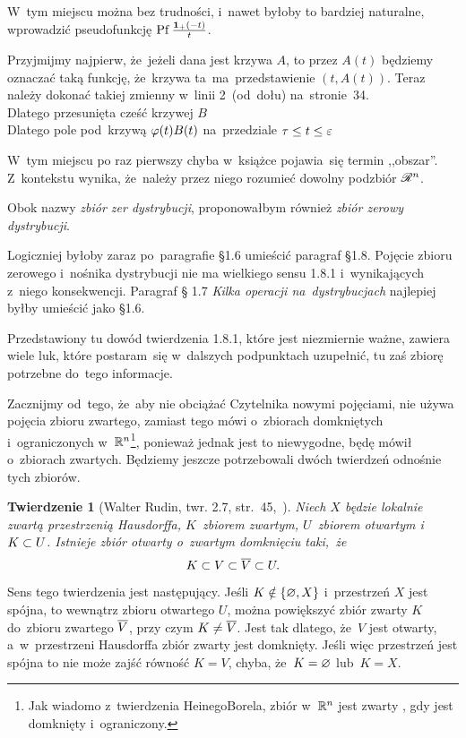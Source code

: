 \documentclass[a4paper,11pt]{article}
\newtheorem{twr}{Twierdzenie} %
\begin{document}
\start {} W~tym miejscu można bez trudności, i~nawet byłoby to
bardziej naturalne, wprowadzić pseudofunkcję
$\mathrm{Pf}\, \frac{ \mathbf{1}_{ + }( -t )}{ t }$.

\start {} Przyjmijmy najpierw, że~jeżeli dana jest krzywa
$A$, to przez $A( t )$ będziemy oznaczać taką funkcję, że~krzywa
ta~ma~przedstawienie $( t, A( t ) )$. Teraz należy dokonać takiej
zmienny w~linii 2~(od~dołu) na~stronie~34. \\
\Jest Dlatego przesunięta cześć krzywej $B$ \\
\Pow Dlatego pole pod~krzywą $\varphi( t ) B( t )$ na~przedziale
$\tau \leq t \leq \varepsilon$

\start {} W~tym miejscu po raz pierwszy chyba w~książce
pojawia~się termin ,,obszar''. Z~kontekstu wynika, że~należy przez
niego rozumieć dowolny podzbiór $\mathcal{R}^{ n }$.

\start {} Obok nazwy \emph{zbiór zer dystrybucji}, proponowałbym
również \emph{zbiór zerowy dystrybucji}.

\start {} Logiczniej byłoby zaraz po~paragrafie \S 1.6 umieścić
paragraf \S 1.8. Pojęcie zbioru zerowego i~nośnika dystrybucji nie ma
wielkiego sensu 1.8.1 i~wynikających z~niego konsekwencji. Paragraf \S
1.7 \emph{Kilka operacji na~dystrybucjach} najlepiej byłby umieścić
jako \S 1.6.

\start {} Przedstawiony tu dowód twierdzenia 1.8.1, które
jest niezmiernie ważne, zawiera wiele luk, które postaram~się
w~dalszych podpunktach uzupełnić, tu zaś zbiorę potrzebne do~tego
informacje.

Zacznijmy od~tego, że~aby nie obciążać Czytelnika nowymi pojęciami,
nie używa pojęcia zbioru zwartego, zamiast tego mówi o~zbiorach
domkniętych i~ograniczonych w~$\mathbb{ R }^{ n }$\footnote{Jak wiadomo z~twierdzenia
  Heinego\dywiz Borela, zbiór w~$\mathbb{ R }^{ n }$ jest zwarty \wtw, gdy jest
  domknięty i~ograniczony.}, ponieważ jednak jest to niewygodne, będę
mówił o~zbiorach zwartych. Będziemy jeszcze potrzebowali dwóch
twierdzeń odnośnie tych zbiorów.

\begin{twr}[Walter Rudin, twr. 2.7, str.~45,~\cite{Rud98}]
  \label{twr:Zem-s01-01}
  Niech $X$ będzie lokalnie zwartą przestrzenią Hausdorffa,
  $K$~zbiorem zwartym, $U$~zbiorem otwartym i~$K \subset U$. Istnieje
  zbiór otwarty o~zwartym domknięciu taki,~że
  \begin{equation}
    \label{eq:Zem-s01-04}
    K \subset V \subset \overline{ V } \subset U.
  \end{equation}
\end{twr}
Sens tego twierdzenia jest następujący. Jeśli $K \notin \{ \varnothing, X \}$
i~przestrzeń $X$ jest spójna, to wewnątrz zbioru otwartego $U$, można
powiększyć zbiór zwarty $K$ do~zbioru zwartego $\overline{ V }$, przy czym
$K \neq \overline{ V }$. Jest tak dlatego, że~$V$ jest otwarty,
a~w~przestrzeni Hausdorffa zbiór zwarty jest domknięty. Jeśli więc
przestrzeń jest spójna to nie może zajść równość $K = V$, chyba,
że~$K = \varnothing$ lub~$K = X$.
\end{document}
